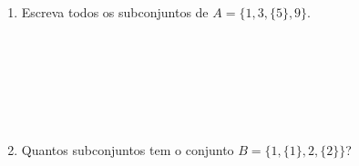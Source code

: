 \documentclass[a4paper,14pt]{article}
\begin{document}
\begin{multicols}{2}
\begin{enumerate}
\begin{enumerate}[a)]
			\end{enumerate}
			\item Escreva todos os subconjuntos de $A = \{1, 3, \{5\}, 9\}$. \\\\\\\\\\\\\\
			\item Quantos subconjuntos tem o conjunto $B = \{1, \{1\}, 2, \{2\}\}$? \\\\\\\\\\\\\\\\
		\end{enumerate}
	\end{multicols}
\end{document}
